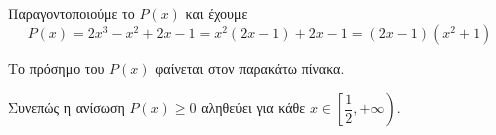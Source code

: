 \begin{alist}
\item Παραγοντοποιούμε το $P(x)$ και έχουμε
\[P(x) = 2x^3 - x^2 + 2x - 1 = x^2(2x - 1) + 2x - 1 = (2x - 1)(x^2 + 1)\]
\item Το πρόσημο του $P(x)$ φαίνεται στον παρακάτω πίνακα.
\begin{center}
\end{center}
Συνεπώς η ανίσωση $P(x) \ge 0$ αληθεύει για κάθε $x \in \left[\dfrac{1}{2}, +\infty\right)$.
\end{alist}

